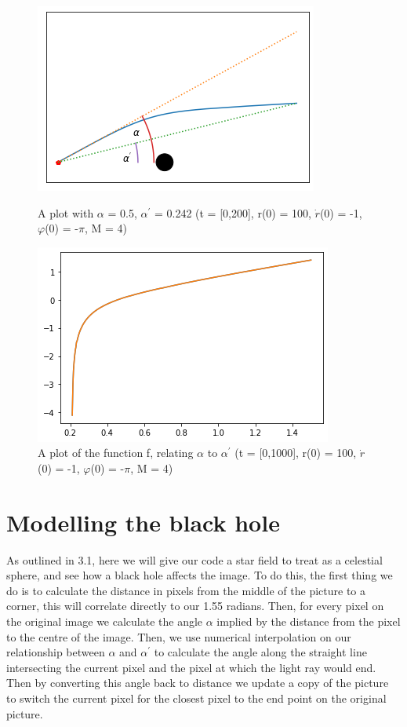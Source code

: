 \documentclass[oneside,openright,frontopenright]{dmathesis}
\begin{document}
\begin{figure}
	\centering
	\begin{minipage}{0.5\textwidth}
		\centering
		\includegraphics[width=0.8\linewidth]{img/alpha_alpha-prime}
		\caption{A plot with $\alpha$ = 0.5, $\alpha^{'}$ = 0.242 (t = [0,200], r(0) = 100, $\dot{r}$(0) = -1, $\varphi$(0) = -$\pi$, M = 4)}
	\end{minipage}%
	\hfill
	\begin{minipage}{0.5\textwidth}
		\centering
		\includegraphics[width=0.8\linewidth]{img/alpha-prime_f(alpha)}
		\caption{A plot of the function f, relating $\alpha$ to $\alpha^{'}$ (t = [0,1000], r(0) = 100, $\dot{r}$(0) = -1, $\varphi$(0) = -$\pi$, M = 4)}
	\end{minipage}
\end{figure}

\section{Modelling the black hole}
	
	As outlined in 3.1, here we will give our code a star field to treat as a celestial sphere, and see how a black hole affects the image. To do this, the first thing we do is to calculate the distance in pixels from the middle of the picture to a corner, this will correlate directly to our 1.55 radians. Then, for every pixel on the original image we calculate the angle $\alpha$ implied by the distance from the pixel to the centre of the image. Then, we use numerical interpolation on our relationship between $\alpha$ and $\alpha^{'}$ to calculate the angle along the straight line intersecting the current pixel and the pixel at which the light ray would end. Then by converting this angle back to distance we update a copy of the picture to switch the current pixel for the closest pixel to the end point on the original picture.
\end{document}
